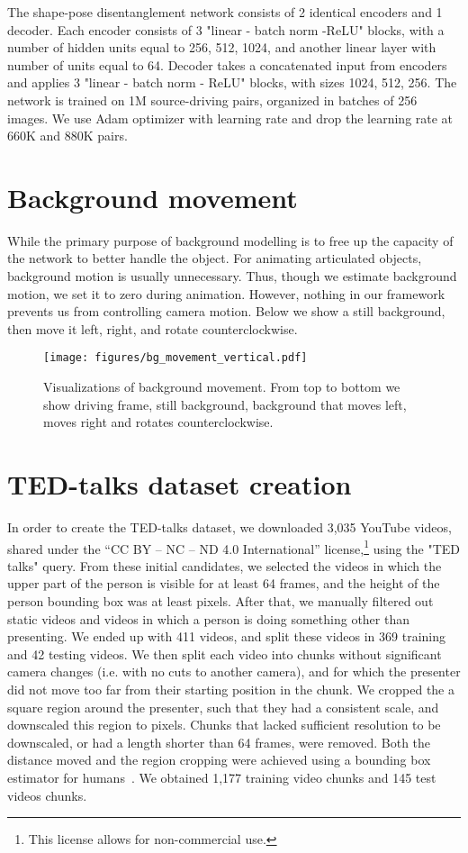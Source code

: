 \documentclass[final]{cvpr}
\begin{document}
The shape-pose disentanglement network consists of 2 identical encoders and 1 decoder. Each encoder consists of 3 "linear - batch norm -ReLU" blocks, with a number of hidden units equal to 256, 512, 1024, and another linear layer with number of units equal to 64. Decoder takes a concatenated input from encoders and applies 3 "linear - batch norm - ReLU" blocks, with sizes 1024, 512, 256. The network is trained on 1M source-driving pairs, organized in batches of 256 images. We use Adam optimizer with learning rate  and drop the learning rate at 660K and 880K pairs.


\section{Background movement}
\label{sec:bg_movement}
While the primary purpose of background modelling is to free up the capacity of the network to better handle the object. For animating articulated objects, background motion is usually unnecessary. Thus, though we estimate background motion, we set it to zero during animation. However, nothing in our framework prevents us from controlling camera motion. Below we show a still background, then move it left, right, and rotate counterclockwise.
\begin{figure}[h]
    \centering
    \texttt{[image: figures/bg\_movement\_vertical.pdf]}
    \label{fig:bg}
    \caption{Visualizations of background movement. From top to bottom we show driving frame, still background, background that moves left, moves right and rotates counterclockwise.}
\end{figure}








\section{TED-talks dataset creation}
\label{sec:ted}
In order to create the TED-talks dataset, we downloaded 3,035 YouTube videos, shared under the “CC BY – NC – ND 4.0 International” license,\!\!\footnote{This license allows for non-commercial use.} using the "TED talks" query. From these initial candidates, we selected the videos in which the upper part of the person is visible for at least 64 frames, and the height of the person bounding box was at least  pixels. After that, we manually filtered out static videos and videos in which a person is doing something other than presenting. We ended up with 411 videos, and split these videos in 369 training and 42 testing videos. We then split each video into  chunks without significant camera changes (i.e. with no cuts to another camera), and for which the presenter did not move too far from their starting position in the chunk. We cropped the a square region around the presenter, such that they had a consistent scale, and downscaled this region to  pixels. Chunks that lacked sufficient resolution to be downscaled, or had a length shorter than 64 frames, were removed. Both the distance moved and the region cropping were achieved using a bounding box estimator for humans~\cite{wu2019detectron2}. We obtained 1,177 training video chunks and 145 test videos chunks.
\end{document}
